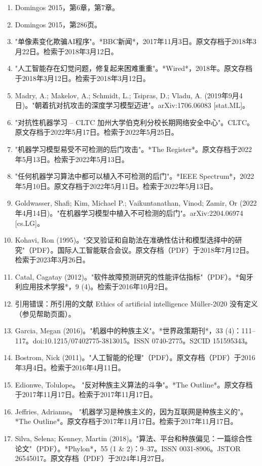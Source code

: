 \begin{enumerate}
\item Domingos 2015，第6章，第7章。
\item Domingos 2015，第286页。
\item "单像素变化欺骗AI程序"。*BBC新闻*，2017年11月3日。原文存档于2018年3月22日。检索于2018年3月12日。
\item "人工智能存在幻觉问题，修复起来困难重重"。*Wired*，2018年。原文存档于2018年3月12日。检索于2018年3月12日。
\item Madry, A.; Makelov, A.; Schmidt, L.; Tsipras, D.; Vladu, A. (2019年9月4日)。"朝着抗对抗攻击的深度学习模型迈进"。arXiv:1706.06083 [stat.ML]。
\item "对抗性机器学习 – CLTC 加州大学伯克利分校长期网络安全中心"。CLTC。原文存档于2022年5月17日。检索于2022年5月25日。
\item "机器学习模型易受不可检测的后门攻击"。*The Register*。原文存档于2022年5月13日。检索于2022年5月13日。
\item "任何机器学习算法中都可以植入不可检测的后门"。*IEEE Spectrum*，2022年5月10日。原文存档于2022年5月11日。检索于2022年5月13日。
\item Goldwasser, Shafi; Kim, Michael P.; Vaikuntanathan, Vinod; Zamir, Or (2022年4月14日)。"在机器学习模型中植入不可检测的后门"。arXiv:2204.06974 [cs.LG]。
\item Kohavi, Ron (1995)。"交叉验证和自助法在准确性估计和模型选择中的研究"（PDF）。国际人工智能联合会议。原文存档（PDF）于2018年7月12日。检索于2023年3月26日。
\item Catal, Cagatay (2012)。"软件故障预测研究的性能评估指标"（PDF）。*匈牙利应用技术学报*，9 (4)。检索于2016年10月2日。
\item 引用错误：所引用的文献 Ethics of artificial intelligence Müller-2020 没有定义（参见帮助页面）。
\item Garcia, Megan (2016)。"机器中的种族主义"。*世界政策期刊*，33 (4)：111–117。doi:10.1215/07402775-3813015。ISSN 0740-2775。S2CID 151595343。
\item Bostrom, Nick (2011)。"人工智能的伦理"（PDF）。原文存档（PDF）于2016年3月4日。检索于2016年4月11日。
\item Edionwe, Tolulope。 "反对种族主义算法的斗争"。*The Outline*。原文存档于2017年11月17日。检索于2017年11月17日。
\item Jeffries, Adrianne。 "机器学习是种族主义的，因为互联网是种族主义的"。*The Outline*。原文存档于2017年11月17日。检索于2017年11月17日。
\item Silva, Selena; Kenney, Martin (2018)。"算法、平台和种族偏见：一篇综合性论文"（PDF）。*Phylon*，55 (1 & 2)：9–37。ISSN 0031-8906。JSTOR 26545017。原文存档（PDF）于2024年1月27日。

\end{enumerate}
